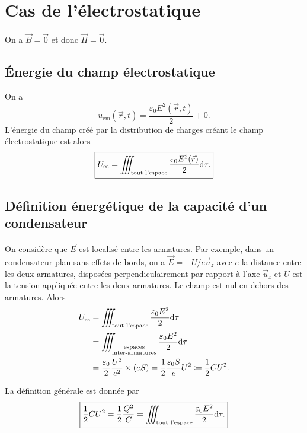\section{Cas de l'électrostatique}

On a $\vec{B}=\vec{0}$ et donc $\vec{\Pi}=\vec{0}$.

\subsection{Énergie du champ électrostatique}

On a 
\begin{equation}
    \boxed{
        u_{\mathrm{em}}(\vec{r},t)=\frac{\varepsilon_0 E^{2}(\vec{r},t)}{2}+0.
    }
\end{equation}
L'énergie du champ créé par la distribution de charges créant le champ électrostatique est alors 
\begin{equation}
    \boxed{
        U_{\mathrm{es}}=\iiint_{\text{tout l'espace}}\frac{\varepsilon_0 E^{2}(\vec{r})}{2}\mathrm{d}\tau.
    }
\end{equation}

\subsection{Définition énergétique de la capacité d'un condensateur}

On considère que $\vec{E}$ est localisé entre les armatures. Par exemple, dans un condensateur plan sans effets de bords, on a $\vec{E}=-U/e\vec{u}_z$ avec $e$ la distance entre les deux armatures, disposées perpendiculairement par rapport à l'axe $\vec{u}_z$ et $U$ est la tension appliquée entre les deux armatures. Le champ est nul en dehors des armatures. Alors
\begin{align}
    U_{\mathrm{es}}
    &=
    \iiint_{\text{tout l'espace}}\frac{\varepsilon_0 E^{2}}{2}\mathrm{d}\tau\\
    &=
    \iiint_{\substack{\text{espaces}\\\text{inter-armatures}}}\frac{\varepsilon_0 E^{2}}{2}\mathrm{d}\tau\\
    &=
    \frac{\varepsilon_0}{2}\frac{U^{2}}{e^{2}}\times(e S)=\frac{1}{2}\frac{\varepsilon_0 S}{e}U^{2}\coloneqq\frac{1}{2}C U^{2}.
\end{align}

La définition générale est donnée par
\begin{equation}
    \boxed{
        \frac{1}{2}CU^{2}=\frac{1}{2}\frac{Q^{2}}{C}=\iiint_{\text{tout l'espace}}\frac{\varepsilon_0 E^{2}}{2}\mathrm{d}\tau.
    }
\end{equation}